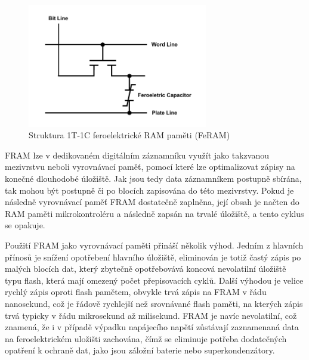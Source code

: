 \begin{figure}[h]
    \centering
    \includegraphics[width=0.70\textwidth]{obrazky-figures/fram_t1-c1.pdf}
    
    \caption{Struktura 1T-1C feroelektrické RAM paměti (FeRAM) \cite{researchgate_nonvolatile_memory_technologies}}
    \label{fig:feram-1t-1c}
\end{figure}

FRAM lze v dedikovaném digitálním záznamníku využít jako takzvanou mezivrstvu neboli vyrovnávací paměť, pomocí které lze optimalizovat zápisy na konečné dlouhodobé úložiště. Jak jsou tedy data záznamníkem postupně sbírána, tak mohou být postupně či po blocích zapisována do této mezivrstvy. Pokud je následně vyrovnávací paměť FRAM dostatečně zaplněna, její obsah je načten do RAM paměti mikrokontroléru a následně zapsán na trvalé úložiště, a tento cyklus se opakuje.

Použití FRAM jako vyrovnávací paměti přináší několik výhod. Jedním z hlavních přínosů je snížení opotřebení hlavního úložiště, eliminován je totiž častý zápis po malých blocích dat, který zbytečně opotřebovává koncová nevolatilní úložiště typu flash, která mají omezený počet přepisovacích cyklů. Další výhodou je velice rychlý zápis oproti flash pamětem, obvykle trvá zápis na FRAM v řádu nanosekund, což je řádově rychlejší než srovnávané flash paměti, na kterých zápis trvá typicky v řádu mikrosekund až milisekund. FRAM je navíc nevolatilní, což znamená, že i v případě výpadku napájecího napětí zůstávají zaznamenaná data na feroelektrickém uložišti zachována, čímž se eliminuje potřeba dodatečných opatření k ochraně dat, jako jsou záložní baterie nebo superkondenzátory.

